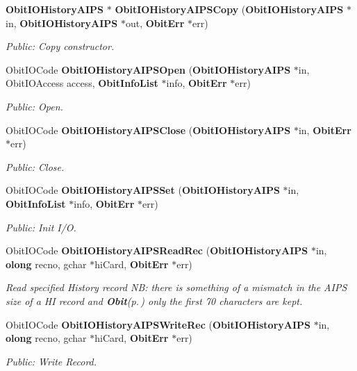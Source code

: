 \begin{CompactItemize}
{\bf Obit\-IOHistory\-AIPS} $\ast$ {\bf Obit\-IOHistory\-AIPSCopy} ({\bf Obit\-IOHistory\-AIPS} $\ast$in, {\bf Obit\-IOHistory\-AIPS} $\ast$out, {\bf Obit\-Err} $\ast$err)
\begin{CompactList}\small\item\em Public: Copy constructor. \item\end{CompactList}\item 
Obit\-IOCode {\bf Obit\-IOHistory\-AIPSOpen} ({\bf Obit\-IOHistory\-AIPS} $\ast$in, Obit\-IOAccess access, {\bf Obit\-Info\-List} $\ast$info, {\bf Obit\-Err} $\ast$err)
\begin{CompactList}\small\item\em Public: Open. \item\end{CompactList}\item 
Obit\-IOCode {\bf Obit\-IOHistory\-AIPSClose} ({\bf Obit\-IOHistory\-AIPS} $\ast$in, {\bf Obit\-Err} $\ast$err)
\begin{CompactList}\small\item\em Public: Close. \item\end{CompactList}\item 
Obit\-IOCode {\bf Obit\-IOHistory\-AIPSSet} ({\bf Obit\-IOHistory\-AIPS} $\ast$in, {\bf Obit\-Info\-List} $\ast$info, {\bf Obit\-Err} $\ast$err)
\begin{CompactList}\small\item\em Public: Init I/O. \item\end{CompactList}\item 
Obit\-IOCode {\bf Obit\-IOHistory\-AIPSRead\-Rec} ({\bf Obit\-IOHistory\-AIPS} $\ast$in, {\bf olong} recno, gchar $\ast$hi\-Card, {\bf Obit\-Err} $\ast$err)
\begin{CompactList}\small\item\em Read specified History record NB: there is something of a mismatch in the AIPS size of a HI record and {\bf Obit}{\rm (p.\,\pageref{structObit})} only the first 70 characters are kept. \item\end{CompactList}\item 
Obit\-IOCode {\bf Obit\-IOHistory\-AIPSWrite\-Rec} ({\bf Obit\-IOHistory\-AIPS} $\ast$in, {\bf olong} recno, gchar $\ast$hi\-Card, {\bf Obit\-Err} $\ast$err)
\begin{CompactList}\small\item\em Public: Write Record. \item\end{CompactList}\item 

\end{CompactItemize}
